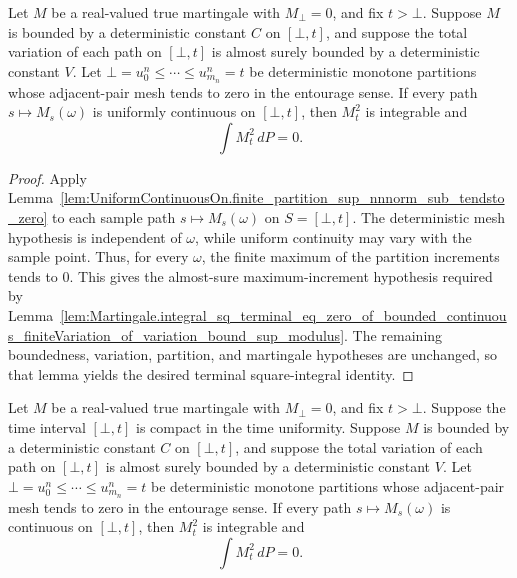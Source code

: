 \begin{lemma}\label{lem:Martingale.integral_sq_terminal_eq_zero_of_bounded_continuous_finiteVariation_of_variation_bound_uniformContinuousOn}
Let \(M\) be a real-valued true martingale with \(M_\bot=0\), and fix
\(t>\bot\).  Suppose \(M\) is bounded by a deterministic constant \(C\) on
\([\bot,t]\), and suppose the total variation of each path on \([\bot,t]\) is
almost surely bounded by a deterministic constant \(V\).  Let
\(\bot=u^n_0\le\cdots\le u^n_{m_n}=t\) be deterministic monotone partitions
whose adjacent-pair mesh tends to zero in the entourage sense.  If every path
\(s\mapsto M_s(\omega)\) is uniformly continuous on \([\bot,t]\), then
\(M_t^2\) is integrable and
\[
  \int M_t^2\,dP=0 .
\]
\end{lemma}

\begin{proof}
Apply
Lemma~\ref{lem:UniformContinuousOn.finite_partition_sup_nnnorm_sub_tendsto_zero}
to each sample path \(s\mapsto M_s(\omega)\) on \(S=[\bot,t]\).  The
deterministic mesh hypothesis is independent of \(\omega\), while uniform
continuity may vary with the sample point.  Thus, for every \(\omega\), the
finite maximum of the partition increments tends to \(0\).  This gives the
almost-sure maximum-increment hypothesis required by
Lemma~\ref{lem:Martingale.integral_sq_terminal_eq_zero_of_bounded_continuous_finiteVariation_of_variation_bound_sup_modulus}.
The remaining boundedness, variation, partition, and martingale hypotheses
are unchanged, so that lemma yields the desired terminal square-integral
identity.
\end{proof}

\begin{lemma}\label{lem:Martingale.integral_sq_terminal_eq_zero_of_bounded_continuous_finiteVariation_of_variation_bound_continuousOn}
Let \(M\) be a real-valued true martingale with \(M_\bot=0\), and fix
\(t>\bot\).  Suppose the time interval \([\bot,t]\) is compact in the time
uniformity.  Suppose \(M\) is bounded by a deterministic constant \(C\) on
\([\bot,t]\), and suppose the total variation of each path on \([\bot,t]\) is
almost surely bounded by a deterministic constant \(V\).  Let
\(\bot=u^n_0\le\cdots\le u^n_{m_n}=t\) be deterministic monotone partitions
whose adjacent-pair mesh tends to zero in the entourage sense.  If every path
\(s\mapsto M_s(\omega)\) is continuous on \([\bot,t]\), then \(M_t^2\) is
integrable and
\[
  \int M_t^2\,dP=0 .
\]
\end{lemma}

